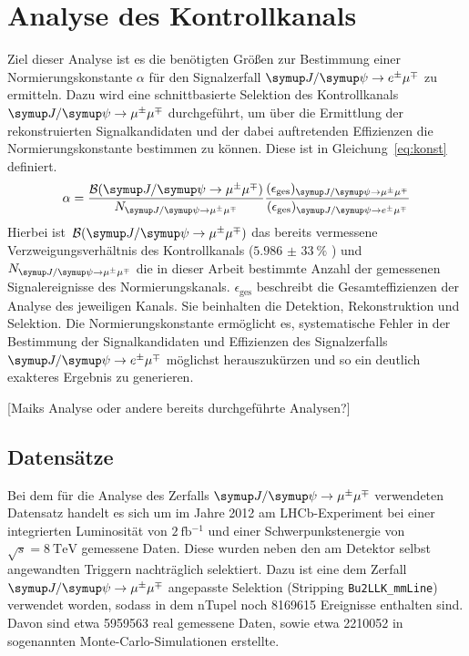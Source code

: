 \chapter{Analyse des Kontrollkanals}
\label{chap:4}
%
Ziel dieser Analyse ist es die benötigten Größen zur Bestimmung einer Normierungskonstante $\alpha$ für den Signalzerfall $\signal$ zu ermitteln. Dazu wird eine schnittbasierte Selektion des Kontrollkanals $\kontroll$ durchgeführt, um über die Ermittlung der rekonstruierten Signalkandidaten und der dabei auftretenden Effizienzen die Normierungskonstante bestimmen zu können. Diese ist in Gleichung~\ref{eq:konst} definiert.
%
\begin{equation}
  \alpha=\frac{\mathcal{B}(\kontroll)}{N_{\kontroll}}\frac{(\epsilon_{\text{ges}})_{\kontroll}}{(\epsilon_{\text{ges}})_{\signal}}
  \label{eq:konst}
\end{equation}
%
Hierbei ist~$\mathcal{B}(\kontroll)$ das bereits vermessene Verzweigungsverhältnis des Kontrollkanals ($\SI{5,986(33)}{\percent}$ \cite{pdg}) und~$N_{\kontroll}$ die in dieser Arbeit bestimmte Anzahl der gemessenen Signalereignisse des Normierungskanals.
$\epsilon_{\text{ges}}$ beschreibt die Gesamteffizienzen der Analyse des jeweiligen Kanals. Sie beinhalten die Detektion, Rekonstruktion und Selektion. Die Normierungskonstante ermöglicht es, systematische Fehler in der Bestimmung der Signalkandidaten und Effizienzen des Signalzerfalls $\signal$ möglichst herauszukürzen und so ein deutlich exakteres Ergebnis zu generieren.

[Maiks Analyse oder andere bereits durchgeführte Analysen?]

\section{Datensätze}
%
Bei dem für die Analyse des Zerfalls $\kontroll$ verwendeten Datensatz handelt es sich um im Jahre 2012 am LHCb-Experiment bei einer integrierten Luminosität von $\SI{2}{\femto\barn^{-1}}$ und einer Schwerpunkstenergie von $\sqrt{s}=\SI{8}{\tera\electronvolt}$ gemessene Daten. Diese wurden neben den am Detektor selbst angewandten Triggern nachträglich selektiert. Dazu ist eine dem Zerfall $\kontroll$ angepasste Selektion (Stripping \texttt{Bu2LLK\_mmLine}) verwendet worden, sodass in dem nTupel noch 8169615 Ereignisse enthalten sind. Davon sind etwa 5959563 real gemessene Daten, sowie etwa 2210052 in sogenannten Monte-Carlo-Simulationen erstellte.\\

